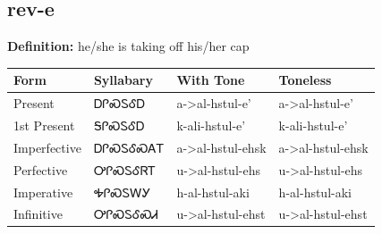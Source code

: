 \documentclass{article}%
\begin{document}
\subsection*{rev-e}%
\textbf{Definition: }%
he/she is taking off his/her cap%
\\[0.5em]%
\begin{tabular}{|l|l|l|l|}%
\hline%
\textbf{Form}&\textbf{Syllabary}&\textbf{With Tone}&\textbf{Toneless}\\%
\hline%
Present&ᎠᎵᏍᏚᎴᎠ&a{-}>al{-}hstul{-}e'&a{-}>al{-}hstul{-}e'\\%
1st Present&ᎦᎵᏍᏚᎴᎠ&k{-}ali{-}hstul{-}e'&k{-}ali{-}hstul{-}e'\\%
Imperfective&ᎠᎵᏍᏚᎴᏍᎪᎢ&a{-}>al{-}hstul{-}ehsk&a{-}>al{-}hstul{-}ehsk\\%
Perfective&ᎤᎵᏍᏚᎴᏒᎢ&u{-}>al{-}hstul{-}ehs&u{-}>al{-}hstul{-}ehs\\%
Imperative&ᎭᎵᏍᏚᎳᎩ&h{-}al{-}hstul{-}aki&h{-}al{-}hstul{-}aki\\%
Infinitive&ᎤᎵᏍᏚᎴᏍᏗ&u{-}>al{-}hstul{-}ehst&u{-}>al{-}hstul{-}ehst\\%
\hline%
\end{tabular}%
\\[1em]%
\end{document}

